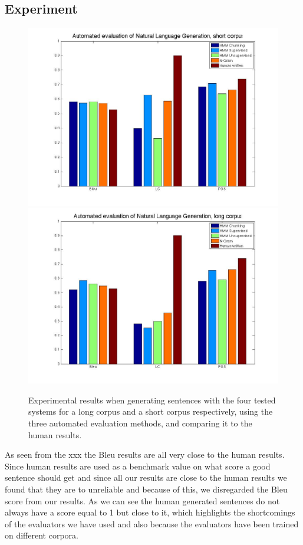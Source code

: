 \documentclass[a4paper,12pt]{article}
\begin{document}
\subsection{Experiment}
\begin{figure}
\centering
\includegraphics[width=0.8\linewidth]{resultsShort}
\includegraphics[width=0.8\linewidth]{results}
\caption{Experimental results when generating sentences with the four tested systems for a long corpus and a short corpus respectively, using the three automated evaluation methods, and comparing it to the human results.}
\label{fig:longresults}
\end{figure}

As seen from the xxx the Bleu results are all very close to the human results. Since human results are used as a
benchmark value on what score a good sentence should get and since all our results are close to the human results
we found that they are to unreliable  and because of this, we disregarded the Bleu score from our results.
As we can see the human generated sentences do not always have a score equal to 1 but close to it, which
highlights the shortcomings of the evaluators we have used and also because the evaluators have been trained on
different corpora.
\end{document}
